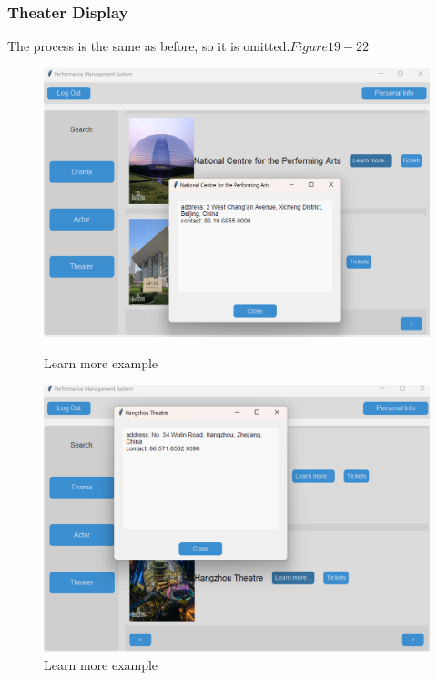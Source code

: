 \documentclass[12pt]{article}
\begin{document}
\subsubsection{Theater Display}
\par The process is the same as before, so it is omitted.\(Figure19-22\)
\begin{figure}[H]
    \centering
    \begin{minipage}{0.48\textwidth}
        \centering
        \includegraphics[width=\textwidth]{19.png}
        \caption{Learn more example} 
        \label{Figure 19}
    \end{minipage}
    \hfill
    \begin{minipage}{0.48\textwidth}
        \centering
        \includegraphics[width=\textwidth]{20.png}
        \caption{Learn more example}
        \label{Figure 20}
    \end{minipage}
\end{figure}
\end{document}
